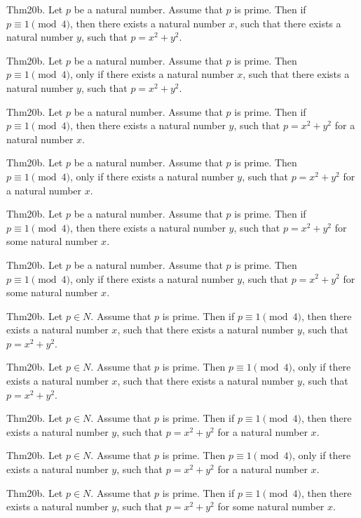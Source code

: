 \documentclass{article}
\begin{document}
Thm20b. Let $p$ be a natural number. Assume that $p$ is prime. Then if $p \equiv 1 \pmod{ 4}$, then there exists a natural number $x$, such that there exists a natural number $y$, such that $p = x ^{ 2}+ y ^{ 2}$.

Thm20b. Let $p$ be a natural number. Assume that $p$ is prime. Then $p \equiv 1 \pmod{ 4}$, only if there exists a natural number $x$, such that there exists a natural number $y$, such that $p = x ^{ 2}+ y ^{ 2}$.

Thm20b. Let $p$ be a natural number. Assume that $p$ is prime. Then if $p \equiv 1 \pmod{ 4}$, then there exists a natural number $y$, such that $p = x ^{ 2}+ y ^{ 2}$ for a natural number $x$.

Thm20b. Let $p$ be a natural number. Assume that $p$ is prime. Then $p \equiv 1 \pmod{ 4}$, only if there exists a natural number $y$, such that $p = x ^{ 2}+ y ^{ 2}$ for a natural number $x$.

Thm20b. Let $p$ be a natural number. Assume that $p$ is prime. Then if $p \equiv 1 \pmod{ 4}$, then there exists a natural number $y$, such that $p = x ^{ 2}+ y ^{ 2}$ for some natural number $x$.

Thm20b. Let $p$ be a natural number. Assume that $p$ is prime. Then $p \equiv 1 \pmod{ 4}$, only if there exists a natural number $y$, such that $p = x ^{ 2}+ y ^{ 2}$ for some natural number $x$.

Thm20b. Let $p \in N$. Assume that $p$ is prime. Then if $p \equiv 1 \pmod{ 4}$, then there exists a natural number $x$, such that there exists a natural number $y$, such that $p = x ^{ 2}+ y ^{ 2}$.

Thm20b. Let $p \in N$. Assume that $p$ is prime. Then $p \equiv 1 \pmod{ 4}$, only if there exists a natural number $x$, such that there exists a natural number $y$, such that $p = x ^{ 2}+ y ^{ 2}$.

Thm20b. Let $p \in N$. Assume that $p$ is prime. Then if $p \equiv 1 \pmod{ 4}$, then there exists a natural number $y$, such that $p = x ^{ 2}+ y ^{ 2}$ for a natural number $x$.

Thm20b. Let $p \in N$. Assume that $p$ is prime. Then $p \equiv 1 \pmod{ 4}$, only if there exists a natural number $y$, such that $p = x ^{ 2}+ y ^{ 2}$ for a natural number $x$.

Thm20b. Let $p \in N$. Assume that $p$ is prime. Then if $p \equiv 1 \pmod{ 4}$, then there exists a natural number $y$, such that $p = x ^{ 2}+ y ^{ 2}$ for some natural number $x$.
\end{document}
